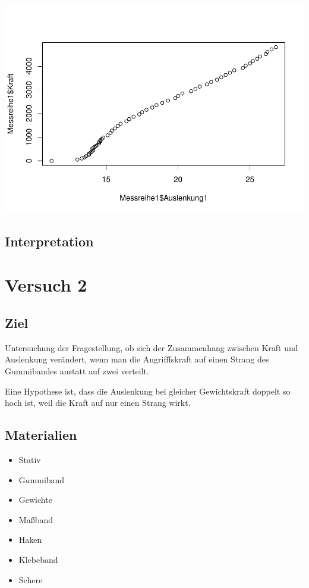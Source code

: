 \documentclass[
]{article}
\providecommand{\tightlist}{%
  \setlength{\itemsep}{0pt}\setlength{\parskip}{0pt}}
\begin{document}
\includegraphics{DehnbareStoffe_files/figure-latex/unnamed-chunk-3-2.pdf}

\hypertarget{interpretation}{%
\subsection{Interpretation}\label{interpretation}}

\hypertarget{versuch-2}{%
\section{Versuch 2}\label{versuch-2}}

\hypertarget{ziel-1}{%
\subsection{Ziel}\label{ziel-1}}

Untersuchung der Fragestellung, ob sich der Zusammenhang zwischen Kraft
und Auslenkung verändert, wenn man die Angrifffskraft auf einen Strang
des Gummibandes anstatt auf zwei verteilt.

Eine Hypothese ist, dass die Auslenkung bei gleicher Gewichtskraft
doppelt so hoch ist, weil die Kraft auf nur einen Strang wirkt.

\hypertarget{materialien-1}{%
\subsection{Materialien}\label{materialien-1}}

\begin{itemize}
\tightlist
\item
  Stativ
\item
  Gummiband
\item
  Gewichte
\item
  Maßband
\item
  Haken
\item
  Klebeband
\item
  Schere
\end{itemize}
\end{document}
